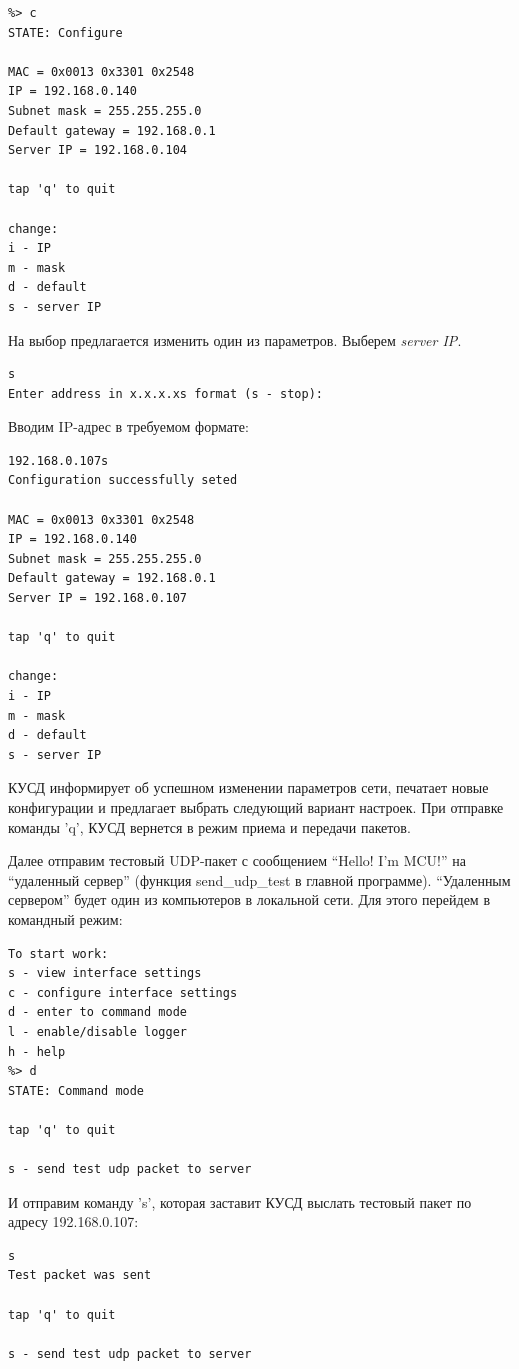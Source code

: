 \begin{verbatim}
%> c
STATE: Configure

MAC = 0x0013 0x3301 0x2548 
IP = 192.168.0.140
Subnet mask = 255.255.255.0
Default gateway = 192.168.0.1
Server IP = 192.168.0.104

tap 'q' to quit

change:
i - IP
m - mask
d - default
s - server IP
\end{verbatim}

На выбор предлагается изменить один из параметров. Выберем \textit{server IP}.

\begin{verbatim}
s
Enter address in x.x.x.xs format (s - stop):
\end{verbatim}

Вводим IP-адрес в требуемом формате:

\begin{verbatim}
192.168.0.107s
Configuration successfully seted

MAC = 0x0013 0x3301 0x2548 
IP = 192.168.0.140
Subnet mask = 255.255.255.0
Default gateway = 192.168.0.1
Server IP = 192.168.0.107

tap 'q' to quit

change:
i - IP
m - mask
d - default
s - server IP
\end{verbatim}

КУСД информирует об успешном изменении параметров сети, печатает новые конфигурации и предлагает выбрать следующий вариант настроек. При отправке команды 'q', КУСД вернется в режим приема и передачи пакетов.

Далее отправим тестовый UDP-пакет с сообщением ``Hello! I'm MCU!'' на ``удаленный сервер'' (функция send\_udp\_test в главной программе). ``Удаленным сервером'' будет один из компьютеров в локальной сети. Для этого перейдем в командный режим:

\begin{verbatim}
To start work:
s - view interface settings
c - configure interface settings
d - enter to command mode
l - enable/disable logger
h - help
%> d
STATE: Command mode

tap 'q' to quit

s - send test udp packet to server
\end{verbatim}

И отправим команду 's', которая заставит КУСД выслать тестовый пакет по адресу 192.168.0.107:

\begin{verbatim}
s
Test packet was sent

tap 'q' to quit

s - send test udp packet to server
\end{verbatim}

